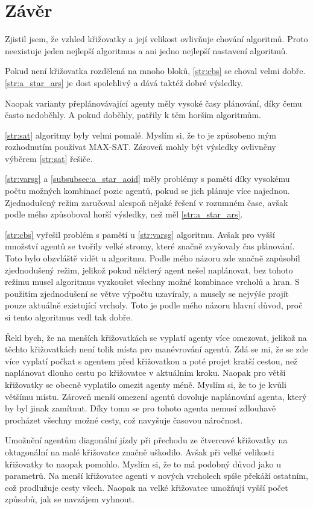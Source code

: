 \chapter*{Závěr}


Zjistil jsem, že vzhled křižovatky a její velikost ovlivňuje chování algoritmů.
Proto neexistuje jeden nejlepší algoritmus a ani jedno nejlepší nastavení algoritmů.

Pokud není křižovatka rozdělená na mnoho bloků, \ref{str:cbs} se choval velmi dobře.
\ref{str:a_star_ars} je dost spolehlivý a dává taktéž dobré výsledky.

Naopak varianty přeplánovávající agenty měly vysoké časy plánování, díky čemu často nedoběhly.
A pokud doběhly, patřily k těm horším algoritmům.

\ref{str:sat} algoritmy byly velmi pomalé.
Myslím si, že to je způsobeno mým rozhodnutím používat MAX-SAT\@.
Zároveň mohly být výsledky ovlivněny výběrem \ref{str:sat} řešiče.

\ref{str:varsg} a \ref{subsubsec:a_star_aoid} měly problémy s pamětí díky vysokému počtu možných kombinací
pozic agentů, pokud se jich plánuje více najednou.
Zjednodušený režim zaručoval alespoň nějaké řešení v rozumném čase, avšak podle mého způsoboval horší výsledky,
než měl \ref{str:a_star_ars}.

\ref{str:cbs} vyřešil problém s pamětí u \ref{str:varsg} algoritmu.
Avšak pro vyšší množství agentů se tvořily velké stromy, které značně zvyšovaly čas plánování.
Toto bylo obzvláště vidět u  algoritmu.
Podle mého názoru zde značně zapůsobil zjednodušený režim, jelikož pokud některý agent nešel naplánovat,
bez tohoto režimu musel algoritmus vyzkoušet všechny možné kombinace vrcholů a hran.
S použitím zjednodušení se větve výpočtu uzavíraly, a musely se nejvýše projít pouze aktuálně existující vrcholy.
Toto je podle mého názoru hlavní důvod, proč si tento algoritmus vedl tak dobře.

Řekl bych, že na menších křižovatkách se vyplatí agenty více omezovat, jelikož na těchto křižovatkách není tolik
místa pro manévrování agentů.
Zdá se mi, že se zde více vyplatí počkat s agentem před křižovatkou a poté projet kratší cestou,
než naplánovat dlouho cestu po křižovatce v aktuálním kroku.
Naopak pro větší křižovatky se obecně vyplatilo omezit agenty méně.
Myslím si, že to je kvůli většímu místu.
Zároveň menší omezení agentů dovoluje naplánování agenta, který by byl jinak zamítnut.
Díky tomu se pro tohoto agenta nemusí zdlouhavě procházet všechny možné cesty, což navyšuje časovou náročnost.

Umožnění agentům diagonální jízdy při přechodu ze čtvercové křižovatky na oktagonální na malé křižovatce značně uškodilo.
Avšak při velké velikosti křižovatky to naopak pomohlo.
Myslím si, že to má podobný důvod jako u parametrů.
Na menší křižovatce agenti v nových vrcholech spíše překáží ostatním, což prodlužuje cesty všech.
Naopak na velké křižovatce umožňují vyšší počet způsobů, jak se navzájem vyhnout.

